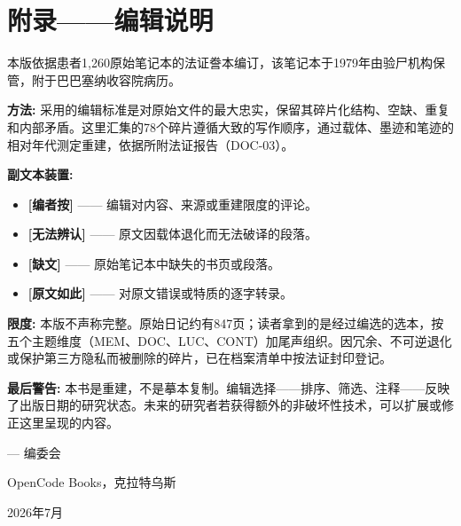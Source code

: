 \cleardoublepage
\thispagestyle{empty}
\chapter*{附录——编辑说明}

\begingroup

本版依据患者1,260原始笔记本的法证誊本编订，该笔记本于1979年由验尸机构保管，附于巴巴塞纳收容院病历。

\vspace{0.6em}

\noindent\textbf{方法:}
采用的编辑标准是对原始文件的最大忠实，保留其碎片化结构、空缺、重复和内部矛盾。这里汇集的78个碎片遵循大致的写作顺序，通过载体、墨迹和笔迹的相对年代测定重建，依据所附法证报告（DOC-03）。

\vspace{0.6em}

\noindent\textbf{副文本装置:}
\begin{itemize}
  \item \textbf{[编者按]} —— 编辑对内容、来源或重建限度的评论。
  \item \textbf{[无法辨认]} —— 原文因载体退化而无法破译的段落。
  \item \textbf{[缺文]} —— 原始笔记本中缺失的书页或段落。
  \item \textbf{[原文如此]} —— 对原文错误或特质的逐字转录。
\end{itemize}

\vspace{0.6em}

\noindent\textbf{限度:}
本版不声称完整。原始日记约有847页；读者拿到的是经过编选的选本，按五个主题维度（MEM、DOC、LUC、CONT）加尾声组织。因冗余、不可逆退化或保护第三方隐私而被删除的碎片，已在档案清单中按法证封印登记。

\vspace{0.6em}

\noindent\textbf{最后警告:}
本书是重建，不是摹本复制。编辑选择——排序、筛选、注释——反映了出版日期的研究状态。未来的研究者若获得额外的非破坏性技术，可以扩展或修正这里呈现的内容。

\vspace{1.2em}

\begin{flushright}
--- 编委会\par
OpenCode Books，克拉特乌斯\par
2026年7月
\end{flushright}

\endgroup
\clearpage
